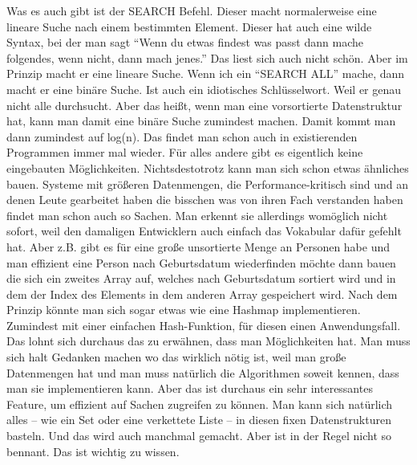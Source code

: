 {Was es auch gibt ist der SEARCH Befehl. Dieser macht normalerweise eine lineare Suche nach einem bestimmten Element. Dieser hat auch eine wilde Syntax, bei der man sagt ``Wenn du etwas findest was passt dann mache folgendes, wenn nicht, dann mach jenes.'' Das liest sich auch nicht schön. Aber im Prinzip macht er eine lineare Suche. Wenn ich ein ``SEARCH ALL'' mache, dann macht er eine binäre Suche. Ist auch ein idiotisches Schlüsselwort. Weil er genau nicht alle durchsucht. Aber das heißt, wenn man eine vorsortierte Datenstruktur hat, kann man damit eine binäre Suche zumindest machen. Damit kommt man dann zumindest auf log(n). Das findet man schon auch in existierenden Programmen immer mal wieder. Für alles andere gibt es eigentlich keine eingebauten Möglichkeiten. Nichtsdestotrotz kann man sich schon etwas ähnliches bauen. Systeme mit größeren Datenmengen, die Performance-kritisch sind und an denen Leute gearbeitet haben die bisschen was von ihren Fach verstanden haben findet man schon auch so Sachen. Man erkennt sie allerdings womöglich nicht sofort, weil den damaligen Entwicklern auch einfach das Vokabular dafür gefehlt hat. Aber z.B. gibt es für eine große unsortierte Menge an Personen habe und man effizient eine Person nach Geburtsdatum wiederfinden möchte dann bauen die sich ein zweites Array auf, welches nach Geburtsdatum sortiert wird und in dem der Index des Elements in dem anderen Array gespeichert wird. Nach dem Prinzip könnte man sich sogar etwas wie eine Hashmap implementieren. Zumindest mit einer einfachen Hash-Funktion, für diesen einen Anwendungsfall. Das lohnt sich durchaus das zu erwähnen, dass man Möglichkeiten hat. Man muss sich halt Gedanken machen wo das wirklich nötig ist, weil man große Datenmengen hat und man muss natürlich die Algorithmen soweit kennen, dass man sie implementieren kann. Aber das ist durchaus ein sehr interessantes Feature, um effizient auf Sachen zugreifen zu können. Man kann sich natürlich alles -- wie ein Set oder eine verkettete Liste -- in diesen fixen Datenstrukturen basteln. Und das wird auch manchmal gemacht. Aber ist in der Regel nicht so bennant. Das ist wichtig zu wissen.
\medskip

}

